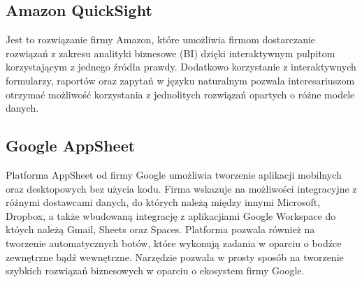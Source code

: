 \subsection{Amazon QuickSight}
Jest to rozwiązanie firmy Amazon, które umożliwia firmom dostarczanie rozwiązań z zakresu analityki biznesowe (BI) dzięki interaktywnym pulpitom korzystającym z jednego źródła prawdy. Dodatkowo korzystanie z interaktywnych formularzy, raportów oraz zapytań w języku naturalnym pozwala interesariuszom otrzymać możliwość korzystania z jednolitych rozwiązań opartych o różne modele danych\cite{AmazonQuickSight}.

\subsection{Google AppSheet}
Platforma AppSheet od firmy Google umożliwia tworzenie aplikacji mobilnych oraz desktopowych bez użycia kodu. Firma wskazuje na możliwości integracyjne z różnymi dostawcami danych, do których należą między innymi Microsoft, Dropbox, a także wbudowaną integrację z aplikacjiami Google Workspace do któych należą Gmail, Sheets oraz Spaces. Platforma pozwala również na tworzenie automatycznych botów, które wykonują zadania w oparciu o bodźce zewnętrzne bądź wewnętrzne. Narzędzie pozwala w prosty sposób na tworzenie szybkich rozwiązań biznesowych w oparciu o ekosystem firmy Google\cite{GoogleAppSheet}.
